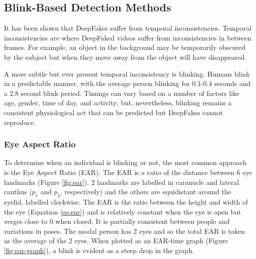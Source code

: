 \subsection{Blink-Based Detection Methods}


It has been shown that DeepFakes suffer from temporal inconsistencies\cite{juefei2022countering}. Temporal inconsistencies are where DeepFaked videos suffer from inconsistencies in between frames. For example, an object in the background may be temporarily obscured by the subject but when they move away from the object will have disappeared. 

A more subtle but ever present temporal inconsistency is blinking. Humans blink in a predictable manner, with the average person blinking for 0.1-0.4 seconds and a 2.8 second blink period\cite{schiffman1990sensation}. Timings can vary based on a number of factors like age, gender, time of day, and activity\cite{jung2020deepvision}; but, nevertheless, blinking remains a consistent physiological act that can be predicted but DeepFakes cannot reproduce.

\subsubsection{Eye Aspect Ratio}

To determine when an individual is blinking or not, the most common approach is the Eye Aspect Ratio (EAR)\cite{soukupova2016eye}. The EAR is a ratio of the distance between 6 eye landmarks (Figure \ref{fig:ear}). 2 landmarks are labelled in caranucle and lateral canthus ($p_1$ and $p_4$, respectively) and the others are equidistant around the eyelid, labelled clockwise. The EAR is the ratio between the height and width of the eye (Equation \ref{eq:ear}) and is relatively constant when the eye is open but verges close to 0 when closed. It is partially consistent between people and variations in poses. The modal person has 2 eyes and so the total EAR is taken as the average of the 2 eyes. When plotted as an EAR-time graph (Figure \ref{fig:ear-graph}), a blink is evident as a steep drop in the graph. 

